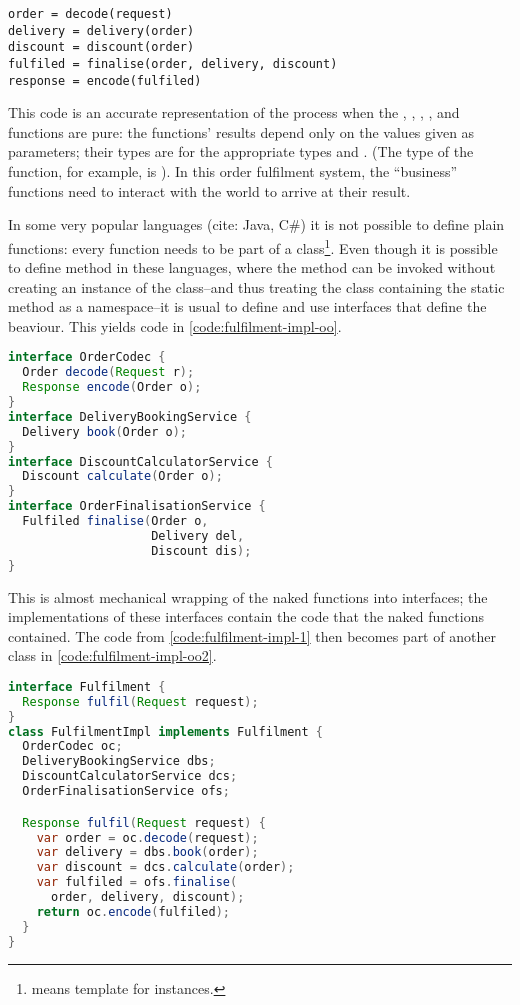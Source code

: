 \documentclass[10 pt, twocolumn]{article}
\begin{document}
\begin{lstlisting}[caption={Fulfilment implementation I}, label={code:fulfilment-impl-1}, language=Pseudo, escapechar=|]
order = decode(request)
delivery = delivery(order)
discount = discount(order)
fulfiled = finalise(order, delivery, discount)
response = encode(fulfiled)
\end{lstlisting}

This code is an accurate representation of the process when the , , , , and  functions are pure: the functions' results depend only on the values given as parameters; their types are  for the appropriate types  and . (The type of the  function, for example, is ). In this order fulfilment system, the ``business'' functions need to interact with the world to arrive at their result. 

In some very popular languages (cite: Java, C\#) it is not possible to define plain functions: every function needs to be part of a class\footnote{ means template for instances.}. Even though it is possible to define  method in these languages, where the method can be invoked without creating an instance of the class--and thus treating the class containing the static method as a namespace--it is usual to define and use interfaces that define the beaviour\cite{prospring}. This yields code in \autoref{code:fulfilment-impl-oo}.

\begin{lstlisting}[caption={Fulfilment OO implementation I}, label={code:fulfilment-impl-oo}, language=Java, escapechar=|]
interface OrderCodec {
  Order decode(Request r);
  Response encode(Order o);
}
interface DeliveryBookingService {
  Delivery book(Order o);
}
interface DiscountCalculatorService {
  Discount calculate(Order o);
}
interface OrderFinalisationService {
  Fulfiled finalise(Order o, 
                    Delivery del, 
                    Discount dis);
}
\end{lstlisting}

This is almost mechanical wrapping of the naked functions into interfaces; the implementations of these interfaces contain the code that the naked functions contained. The code from \autoref{code:fulfilment-impl-1} then becomes part of another class in \autoref{code:fulfilment-impl-oo2}.

\begin{lstlisting}[caption={Fulfilment OO implementation II}, label={code:fulfilment-impl-oo2}, language=Java, escapechar=|]
interface Fulfilment {
  Response fulfil(Request request);
}
class FulfilmentImpl implements Fulfilment {
  OrderCodec oc;
  DeliveryBookingService dbs;
  DiscountCalculatorService dcs;
  OrderFinalisationService ofs;

  Response fulfil(Request request) {
    var order = oc.decode(request);
    var delivery = dbs.book(order);
    var discount = dcs.calculate(order);
    var fulfiled = ofs.finalise(
      order, delivery, discount);
    return oc.encode(fulfiled);
  }
}
\end{lstlisting}
\end{document}
